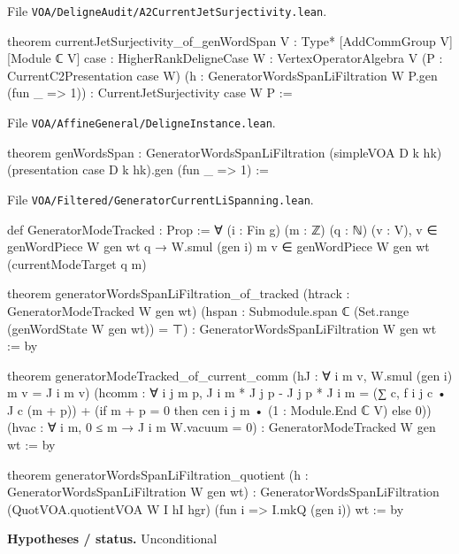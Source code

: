 \documentclass[11pt,openany]{book}
\newcommand{\leanpath}[1]{\texttt{\small #1}}
\theoremstyle{definition}
\theoremstyle{plain}
\begin{document}
{\raggedright\noindent File \leanpath{VOA/\allowbreak DeligneAudit/\allowbreak A2CurrentJetSurjectivity.lean}.\par}
\begin{leancode}
theorem currentJetSurjectivity_of_genWordSpan {V : Type*} [AddCommGroup V] [Module ℂ V]
    {case : HigherRankDeligneCase} {W : VertexOperatorAlgebra V}
    (P : CurrentC2Presentation case W)
    (h : GeneratorWordsSpanLiFiltration W P.gen (fun _ => 1)) :
    CurrentJetSurjectivity case W P :=
\end{leancode}
{\raggedright\noindent File \leanpath{VOA/\allowbreak AffineGeneral/\allowbreak DeligneInstance.lean}.\par}
\begin{leancode}
theorem genWordsSpan :
    GeneratorWordsSpanLiFiltration (simpleVOA D k hk) (presentation case D k hk).gen (fun _ => 1) :=
\end{leancode}
{\raggedright\noindent File \leanpath{VOA/\allowbreak Filtered/\allowbreak GeneratorCurrentLiSpanning.lean}.\par}
\begin{leancode}
def GeneratorModeTracked : Prop :=
  ∀ (i : Fin g) (m : ℤ) (q : ℕ) (v : V), v ∈ genWordPiece W gen wt q →
    W.smul (gen i) m v ∈ genWordPiece W gen wt (currentModeTarget q m)

theorem generatorWordsSpanLiFiltration_of_tracked (htrack : GeneratorModeTracked W gen wt)
    (hspan : Submodule.span ℂ (Set.range (genWordState W gen wt)) = ⊤) :
    GeneratorWordsSpanLiFiltration W gen wt := by

theorem generatorModeTracked_of_current_comm (hJ : ∀ i m v, W.smul (gen i) m v = J i m v)
    (hcomm : ∀ i j m p, J i m * J j p - J j p * J i m =
      (∑ c, f i j c • J c (m + p)) +
        (if m + p = 0 then cen i j m • (1 : Module.End ℂ V) else 0))
    (hvac : ∀ i m, 0 ≤ m → J i m W.vacuum = 0) :
    GeneratorModeTracked W gen wt := by

theorem generatorWordsSpanLiFiltration_quotient (h : GeneratorWordsSpanLiFiltration W gen wt) :
    GeneratorWordsSpanLiFiltration (QuotVOA.quotientVOA W I hI hgr)
      (fun i => I.mkQ (gen i)) wt := by
\end{leancode}
\noindent\textbf{Hypotheses / status.} Unconditional\par
\medskip
\end{document}
